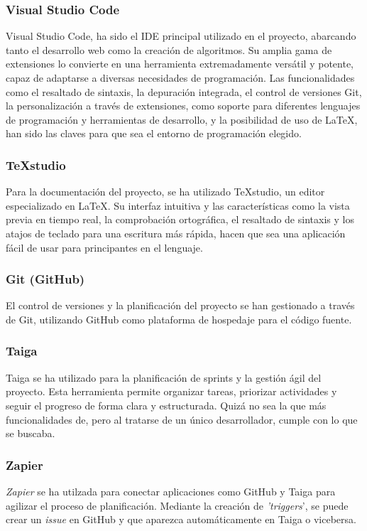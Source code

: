 \subsubsection{Visual Studio Code}
Visual Studio Code, ha sido el IDE principal utilizado en el proyecto, abarcando tanto el desarrollo web como la creación de algoritmos. Su amplia gama de extensiones lo convierte en una herramienta extremadamente versátil y potente, capaz de adaptarse a diversas necesidades de programación. Las funcionalidades como el resaltado de sintaxis, la depuración integrada, el control de versiones Git, la personalización a través de extensiones, como soporte para diferentes lenguajes de programación y herramientas de desarrollo, y la posibilidad de uso de \LaTeX, han sido las claves para que sea el entorno de programación elegido. 
\subsubsection{TeXstudio}
Para la documentación del proyecto, se ha utilizado TeXstudio, un editor especializado en \LaTeX. Su interfaz intuitiva y las características como la vista previa en tiempo real, la comprobación ortográfica, el resaltado de sintaxis y los atajos de teclado para una escritura más rápida, hacen que sea una aplicación fácil de usar para principantes en el lenguaje.

\subsubsection{Git (GitHub)}
El control de versiones y la planificación del proyecto se han gestionado a través de Git, utilizando GitHub como plataforma de hospedaje para el código fuente.

\subsubsection{Taiga}
Taiga se ha utilizado para la planificación de sprints y la gestión ágil del proyecto. Esta herramienta permite organizar tareas, priorizar actividades y seguir el progreso de forma clara y estructurada. Quizá no sea la que más funcionalidades de, pero al tratarse de un único desarrollador, cumple con lo que se buscaba.

\subsubsection{Zapier}
\textit{Zapier} se ha utilzada para conectar aplicaciones como GitHub y Taiga para agilizar el proceso de planificación. Mediante la creación de \textit{'triggers}', se puede crear un \textit{issue} en GitHub y que aparezca automáticamente en Taiga o vicebersa.

